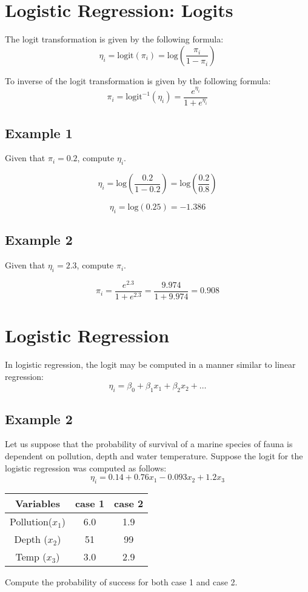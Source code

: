 \documentclass[12pt]{article}
\begin{document}
\section{Logistic Regression: Logits}

The logit transformation is given by the following formula: 
\[ \eta_i = \mbox{logit}(\pi_i)  = \mbox{log}\left( \frac{\pi_i}{1- \pi_i} \right) \]

To inverse of the logit transformation is given by the following formula: 
\[ \pi_i = \mbox{logit}^{-1}(\eta_i)  =  \frac{e^{\eta_i}}{1 + e^{\eta_i}} \]

\subsection{Example 1}
Given that $\pi_i = 0.2$, compute $\eta_i$.

\[ \eta_i = \mbox{log}\left( \frac{0.2}{1-0.2} \right)= \mbox{log}\left( \frac{0.2}{0.8} \right)\] 

\[ \eta_i =  \mbox{log}(0.25) =-1.386 \]

\subsection{Example 2}
Given that $\eta_i = 2.3$, compute $\pi_i$.

\[ \pi_i  =  \frac{e^{2.3}}{1 + e^{2.3}} = \frac{9.974}{1 + 9.974} = 0.908 \]

\newpage
\section{Logistic Regression}
In logistic regression, the logit may be computed in a manner similar to linear regression:
\[ \eta_i = \beta_0 + \beta_1x_1 + \beta_2x_2 + \ldots  \]

\subsection{Example 2}
Let us suppose that the probability of survival of a marine species of fauna is dependent on pollution, depth and water temperature. Suppose the logit for the logistic regression was computed as follows:
\[ \eta_i = 0.14 + 0.76x_1 - 0.093x_2 + 1.2x_3  \]
\begin{center}
	\begin{tabular}{|c|c|c|}
		\hline
		Variables & case 1 & case 2 \\ \hline
		Pollution($x_1$) & 6.0 & 1.9 \\
		Depth ($x_2$)& 51 & 99 \\
		Temp ($x_3$) & 3.0 & 2.9 \\
		\hline
	\end{tabular}
\end{center}
Compute the probability of success for both case 1 and case 2.
\end{document}

